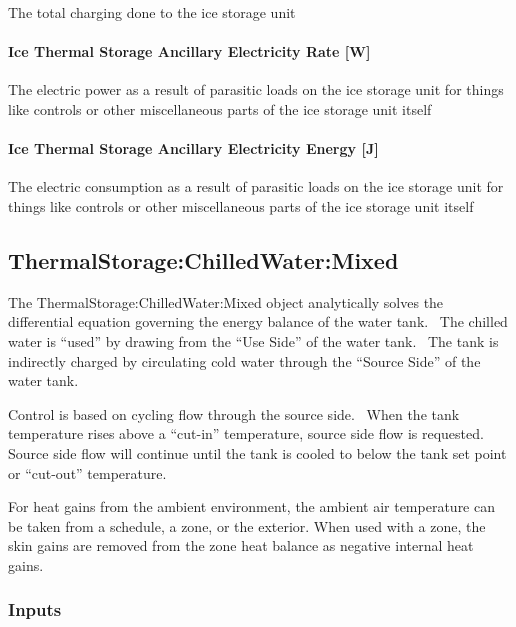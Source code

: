 The total charging done to the ice storage unit

\paragraph{Ice Thermal Storage Ancillary Electricity Rate {[}W{]}}\label{ice-thermal-storage-ancillary-electric-power-w}

The electric power as a result of parasitic loads on the ice storage unit for things like controls or other miscellaneous parts of the ice storage unit itself

\paragraph{Ice Thermal Storage Ancillary Electricity Energy {[}J{]}}\label{ice-thermal-storage-ancillary-electric-energy-j}

The electric consumption as a result of parasitic loads on the ice storage unit for things like controls or other miscellaneous parts of the ice storage unit itself

\subsection{ThermalStorage:ChilledWater:Mixed}\label{thermalstoragechilledwatermixed}

The ThermalStorage:ChilledWater:Mixed object analytically solves the differential equation governing the energy balance of the water tank.~ The chilled water is ``used'' by drawing from the ``Use Side'' of the water tank.~ The tank is indirectly charged by circulating cold water through the ``Source Side'' of the water tank.

Control is based on cycling flow through the source side.~ When the tank temperature rises above a ``cut-in'' temperature, source side flow is requested.~ Source side flow will continue until the tank is cooled to below the tank set point or ``cut-out'' temperature.

For heat gains from the ambient environment, the ambient air temperature can be taken from a schedule, a zone, or the exterior. When used with a zone, the skin gains are removed from the zone heat balance as negative internal heat gains.

\subsubsection{Inputs}\label{inputs-22-003}

